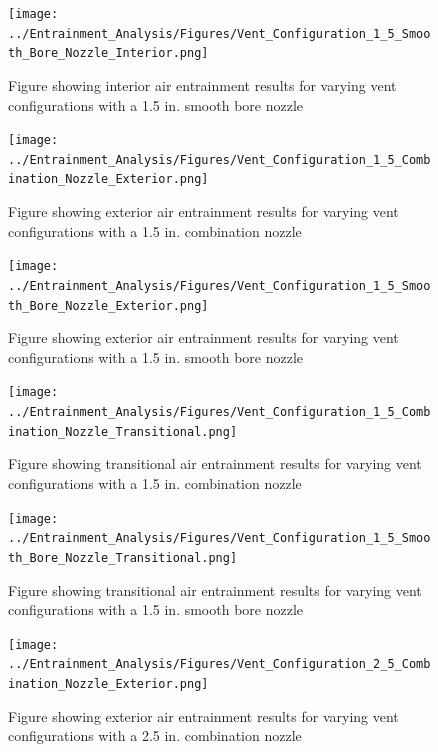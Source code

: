 \documentclass{article}
\begin{document}
\begin{appendices}
\begin{figure}[!ht]
\centering
\texttt{[image: ../Entrainment\_Analysis/Figures/Vent\_Configuration\_1\_5\_Smooth\_Bore\_Nozzle\_Interior.png]}
\caption{Figure showing interior air entrainment results for varying vent configurations with a 1.5 in. smooth bore nozzle}
\label{fig:1_5_Interior_Smooth_Bore_Vent_Config}
\end{figure}

\clearpage

\begin{figure}[!ht]
\centering
\texttt{[image: ../Entrainment\_Analysis/Figures/Vent\_Configuration\_1\_5\_Combination\_Nozzle\_Exterior.png]}
\caption{Figure showing exterior air entrainment results for varying vent configurations with a 1.5 in. combination nozzle}
\label{fig:1_5_Exterior_Combination_Vent_Config}
\end{figure}

\clearpage

\begin{figure}[!ht]
\centering
\texttt{[image: ../Entrainment\_Analysis/Figures/Vent\_Configuration\_1\_5\_Smooth\_Bore\_Nozzle\_Exterior.png]}
\caption{Figure showing exterior air entrainment results for varying vent configurations with a 1.5 in. smooth bore nozzle}
\label{fig:1_5_Exterior_Smooth_Bore_Vent_Config}
\end{figure}

\clearpage

\begin{figure}[!ht]
\centering
\texttt{[image: ../Entrainment\_Analysis/Figures/Vent\_Configuration\_1\_5\_Combination\_Nozzle\_Transitional.png]}
\caption{Figure showing transitional air entrainment results for varying vent configurations with a 1.5 in. combination nozzle}
\label{fig:1_5_Transitional_Combination_Vent_Config}
\end{figure}

\clearpage

\begin{figure}[!ht]
\centering
\texttt{[image: ../Entrainment\_Analysis/Figures/Vent\_Configuration\_1\_5\_Smooth\_Bore\_Nozzle\_Transitional.png]}
\caption{Figure showing transitional air entrainment results for varying vent configurations with a 1.5 in. smooth bore nozzle}
\label{fig:1_5_Transitional_Smooth_Bore_Vent_Config}
\end{figure}

\clearpage

\begin{figure}[!ht]
\centering
\texttt{[image: ../Entrainment\_Analysis/Figures/Vent\_Configuration\_2\_5\_Combination\_Nozzle\_Exterior.png]}
\caption{Figure showing exterior air entrainment results for varying vent configurations with a 2.5 in. combination nozzle}
\label{fig:2_5_Exterior_Combination_Vent_Config}
\end{figure}


\end{appendices}
\end{document}

